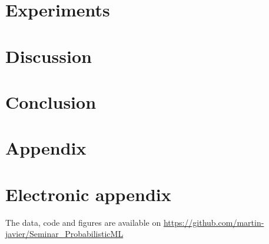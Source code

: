 \documentclass[12pt]{article}
\begin{document}
\section{Experiments}
\label{experiments}

\newpage

\section{Discussion}
\label{discussion}

\newpage

\section{Conclusion}
\label{conclusion}


\newpage


    

\setcounter{page}{16} %

\appendix

\section{Appendix}
\label{app}

\newpage

\section{Electronic appendix}
\label{el_app}

The data, code and figures are available on \url{https://github.com/martin-javier/Seminar_ProbabilisticML}

\newpage
    

\RaggedRight


\newpage

\end{document}
